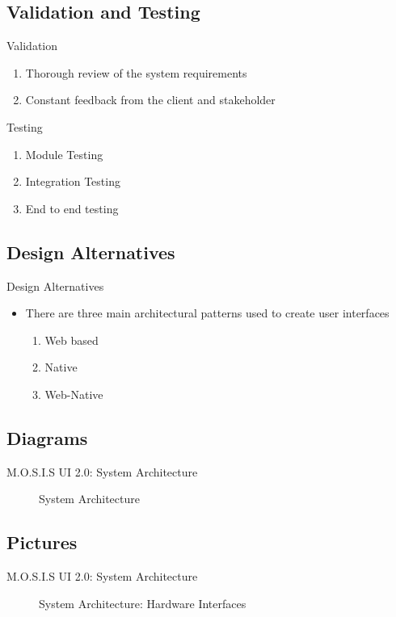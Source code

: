 \documentclass[17pt, aspectratio=169]{beamer}
\begin{document}
\subsection*{Validation and Testing}
\begin{frame}{Validation}
	\begin{enumerate}
		\item Thorough review of the system requirements
		\item Constant feedback from the client and stakeholder
	\end{enumerate}
\end{frame}
\begin{frame}{Testing}
	\begin{enumerate}
		\item Module Testing
		\item Integration Testing
		\item End to end testing
	\end{enumerate}
\end{frame}
\subsection*{Design Alternatives}
\begin{frame}{Design Alternatives}
	\begin{itemize}
		\item There are three main architectural patterns used to create user interfaces
		      \begin{enumerate}
			      \item Web based
			      \item Native
			      \item Web-Native
		      \end{enumerate}
	\end{itemize}
\end{frame}
\subsection*{Diagrams}
\begin{frame}{M.O.S.I.S UI 2.0: System Architecture}
	\begin{figure}
		\caption{System Architecture}
	\end{figure}
\end{frame}
\subsection*{Pictures}
\begin{frame}{M.O.S.I.S UI 2.0: System Architecture}
	\begin{figure}
		\caption{System Architecture: Hardware Interfaces}
	\end{figure}

\end{frame}
\end{document}
